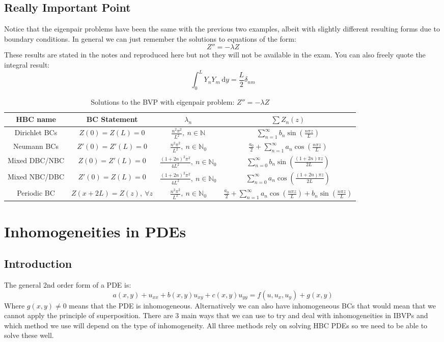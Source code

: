\documentclass[12pt]{article}
\begin{document}
\subsection{Really Important Point}
Notice that the eigenpair problems have been the same with the previous two examples, albeit with slightly different resulting forms due to boundary conditions. In general we can just remember the solutions to equations of the form:
\[Z''=-\lambda Z\]
These results are stated in the notes and reproduced here but not they will not be available in the exam. You can also freely quote the integral result:
\[\int^L_0Y_nY_m\,\text{d}y=\frac{L}{2}\delta_{nm}\]
\begin{table}[H]
    \centering
    \begin{adjustwidth}{-2cm}{}
    \begin{tabular}{|c|c|c|c|}
    \hline
        \textbf{HBC name} & \textbf{BC Statement} & \(\lambda_n\) & \(\sum Z_n(z)\)  \\ \hline
         Dirichlet BCs & \(Z(0)=Z(L)=0\) & \(\frac{n^2\pi^2}{L^2},\ n\in\mathbb{N}\) & \(\sum^\infty_{n=1}b_n\sin\left(\frac{n\pi z}{L}\right)\) \\ \hline
         Neumann BCs & \(Z'(0)=Z'(L)=0\) & \(\frac{n^2\pi^2}{L^2},\ n\in\mathbb{N}_0\) & \(\frac{a_0}{2}+\sum^\infty_{n=1}a_n\cos\left(\frac{n\pi z}{L}\right)\) \\ \hline
         Mixed DBC/NBC & \(Z(0)=Z'(L)=0\) & \(\frac{(1+2n)^2\pi^2}{4L^2},\ n\in\mathbb{N}_0\) & \(\sum^\infty_{n=0}b_n\sin\left(\frac{(1+2n)\pi z}{2L}\right)\) \\ \hline
         Mixed NBC/DBC & \(Z'(0)=Z(L)=0\) & \(\frac{(1+2n)^2\pi^2}{4L^2},\ n\in\mathbb{N}_0\) & \(\sum^\infty_{n=0}a_n\cos\left(\frac{(1+2n)\pi z}{2L}\right)\) \\ \hline
         Periodic BC & \(Z(x+2L)=Z(z),\ \forall z\) & \(\frac{n^2\pi^2}{L^2},\ n\in\mathbb{N}_0\) & \(\frac{a_0}{2}+\sum^\infty_{n=1}a_n\cos\left(\frac{n\pi z}{L}\right)+b_n\sin\left(\frac{n\pi z}{L}\right)\) \\ \hline
    \end{tabular}
    \end{adjustwidth}
    \caption{Solutions to the BVP with eigenpair problem: \(Z''=-\lambda Z\)}
    \label{tab:HBC-Solutions}
\end{table}
\clearpage
\section{Inhomogeneities in PDEs}
\subsection{Introduction}
The general 2nd order form of a PDE is:
\[a(x,y)+u_{xx}+b(x,y)u_{xy}+c(x,y)u_{yy}=f(u,u_x,u_y)+g(x,y)\]
Where \(g(x,y)\ne 0\) means that the PDE is inhomogeneous. Alternatively we can also have inhomogeneous BCs that would mean that we cannot apply the principle of superposition. There are 3 main ways that we can use to try and deal with inhomogeneities in IBVPs and which method we use will depend on the type of inhomogeneity. All three methods rely on solving HBC PDEs so we need to be able to solve these well.
\end{document}
